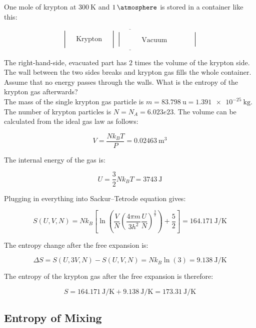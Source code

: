\begin{texample}
	One mole of krypton at $\SI{300}{\kelvin}$ and $\SI{1}{\atmosphere}$ is stored in a container like this:
	
	\[\underline{\overline{\begin{vmatrix} &  &  \\  & \mathrm{Krypton} &  \\  &  & \end{vmatrix} \begin{vmatrix} & & & & & & & \\ & & & \mathrm{Vacuum} & & & \\ & & & & & & & \end{vmatrix}}}\]
	
	The right-hand-side, evacuated part has $2$ times the volume of the krypton side. The wall between the two sides breaks and krypton gas fills the whole container. Assume that no energy passes through the walls. What is the entropy of the krypton gas afterwards? \\
	
	The mass of the single krypton gas particle is $m=\SI{83.798}{\atomicmassunit}=\SI{1.391e-25}{\kilo\gram}$. The number of krypton particles is $N=N_A=6.023e23$. The volume can be calculated from the ideal gas law as follows:
	
	\[V=\frac{Nk_BT}{P}=\SI{0.02463}{\meter\cubed}\]
	
	The internal energy of the gas is:
	
	\[U=\frac32 Nk_BT=\SI{3743}{\joule}\]
	
	Plugging in everything into Sackur–Tetrode equation gives:
	
	\[S(U,V,N)=Nk_B\left[\ln\left( \frac VN \left(\frac{4\pi m}{3h^2}\frac UN\right)^{\frac32}\right)+\frac52\right]=\SI{164.171}{\joule\per\kelvin}\]
	
	The entropy change after the free expansion is:
	
	\[\Delta S=S(U,3V,N)-S(U,V,N)=Nk_B\ln(3)=\SI{9.138}{\joule\per\kelvin}\]
	
	The entropy of the krypton gas after the free expansion is therefore:
	
	\[S=\SI{164.171}{\joule\per\kelvin}+\SI{9.138}{\joule\per\kelvin}=\SI{173.31}{\joule\per\kelvin}\]
\end{texample}

\subsection{Entropy of Mixing}

